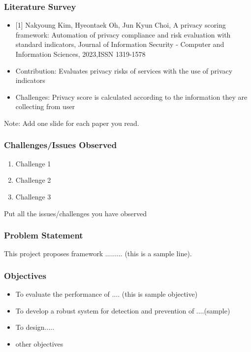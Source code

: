 \documentclass{beamer}
\begin{document}
\begin{frame}
\frametitle{Literature Survey}
\begin{itemize}
\item {[1] Nakyoung Kim, Hyeontaek Oh, Jun Kyun Choi,
A privacy scoring framework: Automation of privacy compliance and risk evaluation with standard indicators,
Journal of Information Security - Computer and Information Sciences,
2023,ISSN 1319-1578 
   }
\item {Contribution: Evaluates privacy risks of services with the use of privacy indicators}
\item {Challenges: Privacy score is calculated according to the information they are collecting from user  }
\end {itemize}

Note: Add one slide for each paper you read.
\end{frame}


\begin{frame}
\frametitle{Challenges/Issues Observed}
\begin{enumerate}
    \item Challenge 1
    \item Challenge 2
    \item Challenge 3
\end{enumerate}
Put all the issues/challenges you have observed
\end{frame}



\begin{frame}
\frametitle{Problem Statement}
This project proposes  framework ......... (this is a sample line).
\end{frame}

\begin{frame}
\frametitle{ Objectives}
\begin{itemize}
\item To evaluate the performance of .... (this is sample objective)
\item To develop a robust system for detection and prevention of ....(sample)
\item To design.....
\item other objectives
\end{itemize}
\end{frame}
\end{document}
